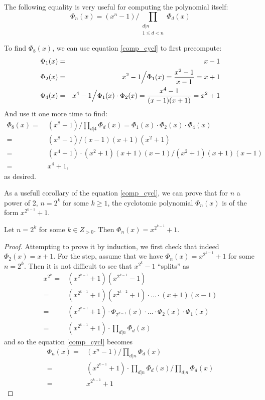 The following equality is very useful for computing the polynomial itself:
\begin{equation}\label{comp_cycl} 
	\Phi_n(x) = (x^n - 1) \bigg/ \prod_{\substack{d | n\\ 1 \leq d < n}} \Phi_d(x) 
\end{equation}
\begin{example}
	To find $\Phi_8(x)$, we can use equation \ref{comp_cycl} to first precompute:
  \begin{align*}
	  \Phi_1(x) = & \hfill &  x - 1 \\
	  \Phi_2(x) = & \hfill & x^2-1\Big/\Phi_1(x) = \frac{x^2 - 1}{x-1} = x+1 \\
	  \Phi_4(x) = & \hfill & x^4-1\Big/\Phi_1(x)\cdot \Phi_2(x) = \frac{x^4-1}{(x-1)(x+1)} = x^2 + 1
  \end{align*}
	  And use it one more time to find:
	  \begin{align*}
		  \Phi_8(x) = \; & (x^8 - 1) \Big/ \prod_{{d | 4}} \Phi_d(x) = \Phi_1(x) \cdot \Phi_2(x) \cdot \Phi_4(x) \\
		  = \; & (x^8 - 1) \Big/(x-1)(x+1)(x^2+1) \\
		  = \; & (x^4+1)\cdot (x^2+1)(x+1)(x-1) \Big/(x^2+1)(x+1)(x-1) \\
		  = \; & x^4 +1,
	  \end{align*}
	  as desired.
\end{example}
As a usefull corollary of the equation \ref{comp_cycl}, we can prove that for $n$ a power of 2, $n = 2^k$ for some $k \geq 1$, the cyclotomic polynomial $\Phi_n(x)$ is of the form $x^{2^{k - 1}} + 1$.
\begin{corollary}\label{2k-cycl}
  Let $n= 2^k$ for some $k \in Z_{> 0}$. Then $\Phi_n(x) = x^{2^{k-1}} + 1$.
\end{corollary}
\begin{proof}
	Attempting to prove it by induction, we first check that indeed $\Phi_2(x) = x+1$. For the step, assume that we have $\Phi_n(x) = x^{2^{k-1}} + 1$ for some $n = 2^k$. Then it is not difficult to see that $x^{2^k} -1$ ``splits'' as 
	\begin{align*}
		x^{2^k} = & (x^{2^{k-1}} + 1)(x^{2^{k-1}} - 1) \\
		= & (x^{2^{k-1}} + 1)(x^{2^{k-2}} + 1) \cdot \ldots \cdot (x+1)(x-1) \\
		= & (x^{2^{k-1}} + 1) \cdot \Phi_{2^{k-1}}(x) \cdot \ldots \cdot \Phi_2(x) \cdot \Phi_1(x) \\
		= & (x^{2^{k-1}} + 1) \cdot \prod_{d | n} \Phi_d(x)
	\end{align*}
	and so the equation \ref{comp_cycl} becomes
	\begin{align*}
		\Phi_n(x) = & (x^n - 1) \Big/ \prod_{d|n} \Phi_d(x) \\
		= & (x^{2^{k-1}} + 1) \cdot \prod_{d|n} \Phi_d(x) \Big/ \prod_{d|n} \Phi_d(x)\\
		= & x^{2^{k-1}} + 1
	\end{align*}
\end{proof}

